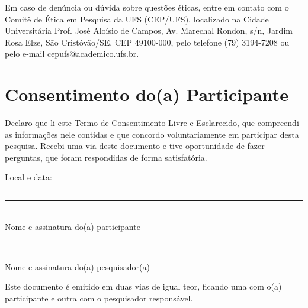 \documentclass[12pt,a4paper,brazil]{article}
\begin{document}
Em caso de denúncia ou dúvida sobre questões éticas, entre em contato com o Comitê de Ética em Pesquisa da UFS (CEP/UFS), localizado na Cidade Universitária Prof. José Aloísio de Campos, Av. Marechal Rondon, s/n, Jardim Rosa Elze, São Cristóvão/SE, CEP 49100-000, pelo telefone (79) 3194-7208 ou pelo e-mail cepufs@academico.ufs.br.

\vspace{1cm}

\section*{Consentimento do(a) Participante}

Declaro que li este Termo de Consentimento Livre e Esclarecido, que compreendi as informações nele contidas e que concordo voluntariamente em participar desta pesquisa. Recebi uma via deste documento e tive oportunidade de fazer perguntas, que foram respondidas de forma satisfatória.

\vspace{1.5cm}

\noindent
\begin{minipage}[t]{0.55\textwidth}
Local e data:\\[1.5cm]
\rule{8cm}{0.4pt}
\end{minipage}

\vspace{1cm}

\noindent
\begin{minipage}[t]{0.48\textwidth}
\centering
\rule{7cm}{0.4pt}\\
Nome e assinatura do(a) participante
\end{minipage}
\hfill
\begin{minipage}[t]{0.48\textwidth}
\centering
\rule{7cm}{0.4pt}\\
Nome e assinatura do(a) pesquisador(a)
\end{minipage}

\vspace{1cm}

\noindent
\footnotesize{Este documento é emitido em duas vias de igual teor, ficando uma com o(a) participante e outra com o pesquisador responsável.}
\end{document}
